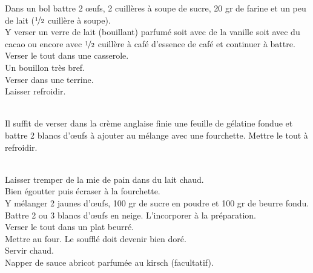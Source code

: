 \begin{minipage}[c]{\textwidth}
Dans un bol battre 2 œufs, 2 cuillères à soupe de sucre, 20 gr de farine et un peu de lait ($\nicefrac{1}{2}$ cuillère à soupe).\\
Y verser un verre de lait (bouillant) parfumé soit avec de la vanille soit avec du cacao ou encore avec $\nicefrac{1}{2}$ cuillère à café d’essence de café et continuer à battre. \\
Verser le tout dans une casserole.\\
Un bouillon très bref.\\
Verser dans une terrine.\\
Laisser refroidir.\\
\\

\end{minipage}

\begin{minipage}[c]{\textwidth}
Il suffit de verser dans la crème anglaise finie une feuille de gélatine fondue et battre 2 blancs d’œufs à ajouter au mélange avec une fourchette. Mettre le tout à refroidir.\\
\\

\end{minipage}

\begin{minipage}[c]{\textwidth}
Laisser tremper de la mie de pain dans du lait chaud. \\
Bien égoutter puis écraser à la fourchette.\\
Y mélanger 2 jaunes d’œufs, 100 gr de sucre en poudre et 100 gr de beurre fondu.\\
Battre 2 ou 3 blancs d’œufs en neige. L’incorporer à la préparation. \\
Verser le tout dans un plat beurré.\\
Mettre au four. Le soufflé doit devenir bien doré. \\
Servir chaud.\\
Napper de sauce abricot parfumée au kirsch (facultatif).\\
\\

\end{minipage}

